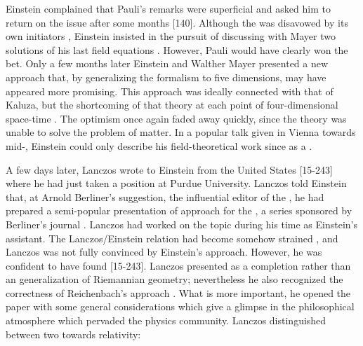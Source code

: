 \documentclass[draft]{article}
\begin{document}
Einstein complained that Pauli's remarks were superficial and asked him to return on the issue after some months [140]. Although the \uftp was disavowed by its own initiators \citep{Weyl1931}, Einstein insisted in the pursuit of \FP discussing with Mayer two solutions of his last field equations \citep{Einstein1930g}. However, Pauli would have clearly won the bet. Only a few months later Einstein and Walther Mayer presented a new approach \citep{Einstein1931} that, by generalizing the \nbein formalism to five dimensions, may have appeared more promising. This approach was ideally connected with that of Kaluza, but the shortcoming of that theory  at each point of four-dimensional space-time \citep[377]{Einstein1931}. The optimism once again faded away quickly, since the theory was unable to solve the problem of matter. In a popular talk given in Vienna towards mid-, Einstein could only describe his field-theoretical work since \gr as a  \citep[441]{Einstein1932b}.

A few days later, Lanczos wrote to Einstein from the United States [15-243] where he had just taken a position at Purdue University. Lanczos told Einstein that, at Arnold Berliner's suggestion, the influential editor of the , he had prepared a semi-popular presentation of \FP approach for the , a series sponsored by Berliner's journal \citep{Lanczos1931}. Lanczos had worked on the topic during his time as Einstein's assistant. The Lanczos/Einstein relation had become somehow strained \citep{Stachel1994}, and Lanczos was not fully convinced by Einstein's approach. However, he was confident to have found  [15-243]. Lanczos presented \FP as a completion rather than an generalization of Riemannian geometry; nevertheless he also recognized the correctness of Reichenbach's approach \citep[118]{Lanczos1931}. What is more important, he opened the paper with some general considerations which give a glimpse in the philosophical atmosphere which pervaded the physics community. Lanczos distinguished between two  towards relativity: 
\end{document}
